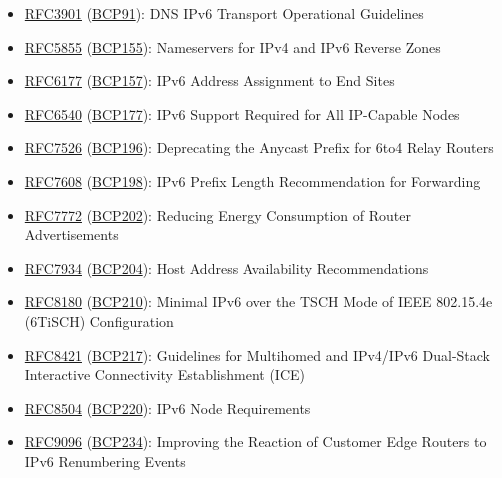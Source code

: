 \documentclass[
]{article}
\providecommand{\tightlist}{%
  \setlength{\itemsep}{0pt}\setlength{\parskip}{0pt}}
\begin{document}
\begin{itemize}
\tightlist
\item
  \href{https://www.rfc-editor.org/info/rfc3901}{RFC3901}
  (\href{https://www.rfc-editor.org/info/bcp91}{BCP91}): DNS IPv6
  Transport Operational Guidelines
\item
  \href{https://www.rfc-editor.org/info/rfc5855}{RFC5855}
  (\href{https://www.rfc-editor.org/info/bcp155}{BCP155}): Nameservers
  for IPv4 and IPv6 Reverse Zones
\item
  \href{https://www.rfc-editor.org/info/rfc6177}{RFC6177}
  (\href{https://www.rfc-editor.org/info/bcp157}{BCP157}): IPv6 Address
  Assignment to End Sites
\item
  \href{https://www.rfc-editor.org/info/rfc6540}{RFC6540}
  (\href{https://www.rfc-editor.org/info/bcp177}{BCP177}): IPv6 Support
  Required for All IP-Capable Nodes
\item
  \href{https://www.rfc-editor.org/info/rfc7526}{RFC7526}
  (\href{https://www.rfc-editor.org/info/bcp196}{BCP196}): Deprecating
  the Anycast Prefix for 6to4 Relay Routers
\item
  \href{https://www.rfc-editor.org/info/rfc7608}{RFC7608}
  (\href{https://www.rfc-editor.org/info/bcp198}{BCP198}): IPv6 Prefix
  Length Recommendation for Forwarding
\item
  \href{https://www.rfc-editor.org/info/rfc7772}{RFC7772}
  (\href{https://www.rfc-editor.org/info/bcp202}{BCP202}): Reducing
  Energy Consumption of Router Advertisements
\item
  \href{https://www.rfc-editor.org/info/rfc7934}{RFC7934}
  (\href{https://www.rfc-editor.org/info/bcp204}{BCP204}): Host Address
  Availability Recommendations
\item
  \href{https://www.rfc-editor.org/info/rfc8180}{RFC8180}
  (\href{https://www.rfc-editor.org/info/bcp210}{BCP210}): Minimal IPv6
  over the TSCH Mode of IEEE 802.15.4e (6TiSCH) Configuration
\item
  \href{https://www.rfc-editor.org/info/rfc8421}{RFC8421}
  (\href{https://www.rfc-editor.org/info/bcp217}{BCP217}): Guidelines
  for Multihomed and IPv4/IPv6 Dual-Stack Interactive Connectivity
  Establishment (ICE)
\item
  \href{https://www.rfc-editor.org/info/rfc8504}{RFC8504}
  (\href{https://www.rfc-editor.org/info/bcp220}{BCP220}): IPv6 Node
  Requirements
\item
  \href{https://www.rfc-editor.org/info/rfc9096}{RFC9096}
  (\href{https://www.rfc-editor.org/info/bcp234}{BCP234}): Improving the
  Reaction of Customer Edge Routers to IPv6 Renumbering Events
\end{itemize}
\end{document}
